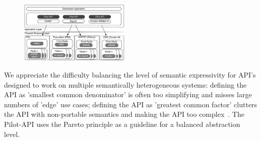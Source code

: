 \documentclass[conference]{IEEEtran}
\begin{document}
\begin{figure}[b]
    \begin{center}
    \up\up
    \includegraphics[width=0.47\textwidth]{../figures/distributed_pilot_job.pdf}
    \caption{
  }
  \end{center}
    \label{fig:figures_distributed_pilot_job}
\end{figure}

We appreciate the difficulty balancing the level of semantic
expressivity for API's designed to work on multiple semantically
heterogeneous systems: defining the API as 'smallest common
denominator' is often too simplifying and misses large numbers of
'edge' use cases; defining the API as 'greatest common factor'
clutters the API with non-portable semantics and making the API too
complex~\cite{leaky_abstractions}.  The Pilot-API uses the Pareto
principle as a guideline for a balanced abstraction level.




\end{document}
